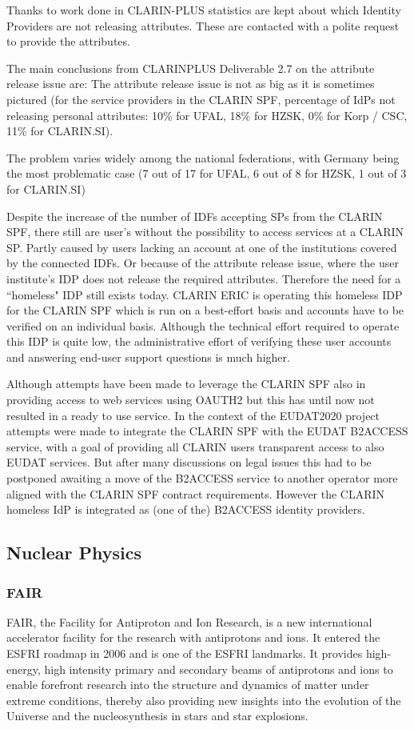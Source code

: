 \documentclass[fleqn,10pt]{wlscirep}
\begin{document}
{Thanks to work done in CLARIN-PLUS\cite{Mistuka} statistics are kept about which Identity Providers are not releasing attributes. These are contacted with a polite request to provide the attributes.

The main conclusions from CLARINPLUS Deliverable 2.7 on the attribute release issue are:
The attribute release issue is not as big as it is sometimes pictured (for the service providers in the CLARIN SPF, percentage of IdPs not releasing personal attributes: 10\% for UFAL, 18\% for HZSK, 0\% for Korp / CSC, 11\% for CLARIN.SI).

The problem varies widely among the national federations, with Germany being the most problematic case (7 out of 17 for UFAL, 6 out of 8 for HZSK, 1 out of 3 for CLARIN.SI)

Despite the increase of the number of IDFs accepting SPs from  the CLARIN SPF, there still are user's without the possibility to access services at a CLARIN SP.  Partly caused by users lacking an account at one of the institutions covered by the connected IDFs. Or because of the attribute release issue, where the user institute’s  IDP does not release the required attributes. Therefore the need for a ``homeless" IDP still exists today. CLARIN ERIC is operating this homeless IDP for the CLARIN SPF which  is run on a best-effort basis and accounts have to be verified on an individual basis. Although the technical effort required to operate this IDP is quite low, the administrative effort of verifying these user accounts and answering end-user support questions is much higher.

Although attempts have been made to leverage the CLARIN SPF also in providing access to web services using OAUTH2 but this has until now not resulted in a ready to use service. In the context of the EUDAT2020 project attempts were made to integrate the CLARIN SPF with the EUDAT B2ACCESS service, with a goal of providing all CLARIN users transparent access to also EUDAT services. But after many discussions on legal issues this had to be postponed awaiting a move of the B2ACCESS service to another operator more aligned with the CLARIN SPF contract requirements. However the CLARIN homeless IdP is integrated as (one of the) B2ACCESS identity providers.

\subsection{Nuclear Physics}
\subsubsection{FAIR}
FAIR, the Facility for Antiproton and Ion Research, is a new international accelerator facility for the research with antiprotons and ions. It entered the ESFRI roadmap in 2006 and is one of the ESFRI landmarks. It provides high-energy, high intensity primary and secondary beams of antiprotons and ions to enable forefront research into the structure and dynamics of matter under extreme conditions, thereby also providing new insights into the evolution of the Universe and the nucleosynthesis in stars and star explosions.
 
}
\end{document}
